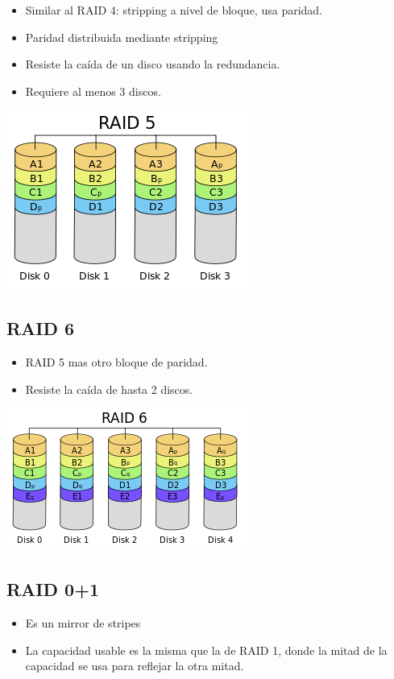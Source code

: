 \begin{itemize}
\item Similar al RAID 4: stripping a nivel de bloque, usa paridad.
\item Paridad distribuida mediante stripping
\item Resiste la caída de un disco usando la redundancia.
\item Requiere al menos 3 discos.
\end{itemize}

\includegraphics[scale=1]{imagenes/raid5}

\subsection{RAID 6}

\begin{itemize}
\item RAID 5 mas otro bloque de paridad.
\item Resiste la caída de hasta 2 discos.
\end{itemize}

\includegraphics[scale=1]{imagenes/raid6}

\subsection{RAID 0+1}

\begin{itemize}
\item Es un mirror de stripes
\item La capacidad usable es la misma que la de RAID 1, donde la mitad de la capacidad se usa para reflejar la otra mitad.
\end{itemize}

